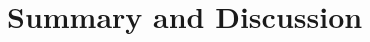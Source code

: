 \documentclass[twocolumn]{aastex63}
\begin{document}
\section{Summary and Discussion} \label{sec:discuss}





\end{document}
